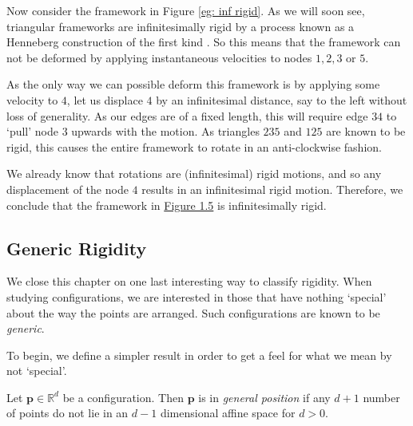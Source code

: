 \begin{example}
\begin{flushleft}
Now consider the framework in Figure \ref{eg: inf rigid}. As we will soon see, triangular frameworks are infinitesimally rigid by a process known as a Henneberg construction of the first kind \cite{henneberg}. So this means that the framework can not be deformed by applying instantaneous velocities to nodes $1,2,3$  or $5$.     
\end{flushleft}

\begin{flushleft}
As the only way we can possible deform this framework is by applying some velocity to $4$, let us displace $4$ by an infinitesimal distance, say to the left without loss of generality. As our edges are of a fixed length, this will require edge $34$ to `pull' node $3$ upwards with the motion. As triangles $235$ and $125$ are known to be rigid, this causes the entire framework to rotate in an anti-clockwise fashion.
\end{flushleft}

\noindent
We already know that rotations are (infinitesimal) rigid motions, and so any displacement of the node $4$ results in an infinitesimal rigid motion. Therefore, we conclude that the framework in \hyperref[eg: inf rigid]{Figure 1.5} is infinitesimally rigid.
\end{example}

\subsection{Generic Rigidity}
We close this chapter on one last interesting way to classify rigidity. When studying configurations, we are interested in those that have nothing `special' about the way the points are arranged. Such configurations are known to be \textit{generic}.

\begin{flushleft}
To begin, we define a simpler result in order to get a feel for what we mean by not `special'.    
\end{flushleft}

\begin{definition}
Let $\mathbf{p} \in \mathbb{R}^d$ be a configuration. Then $\mathbf{p}$ is in \textit{general position} if any $d+1$ number of points do not lie in an $d-1$ dimensional affine space for $d>0$.
\end{definition}

